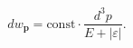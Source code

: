 \par\begin{equation}
 dw_{\mathbf p}=\mathrm{const}\cdot\frac{d^3p}{E+|\varepsilon|}.
 \tag{146.3}
\end{equation}
